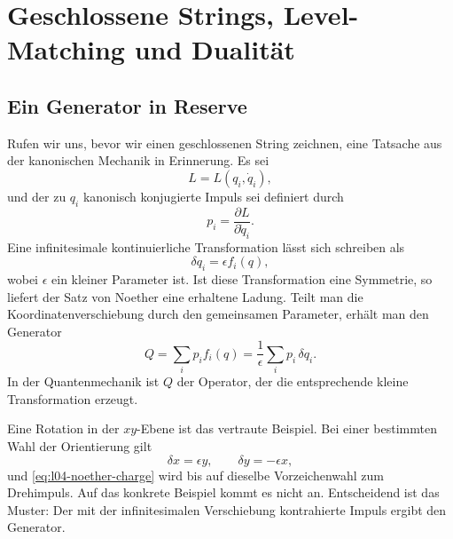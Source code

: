 \chapter{Geschlossene Strings, Level-Matching und Dualität}


\section{Ein Generator in Reserve}

Rufen wir uns, bevor wir einen geschlossenen String zeichnen, eine Tatsache aus der kanonischen Mechanik in Erinnerung. Es sei
\begin{equation}
  L=L(q_i,\dot q_i),
\end{equation}
und der zu \(q_i\) kanonisch konjugierte Impuls sei definiert durch
\begin{equation}
  p_i=\frac{\partial L}{\partial\dot q_i}.
\end{equation}
Eine infinitesimale kontinuierliche Transformation lässt sich schreiben als
\begin{equation}
  \delta q_i=\epsilon f_i(q),
  \label{eq:l04-infinitesimal-transformation}
\end{equation}
wobei \(\epsilon\) ein kleiner Parameter ist. Ist diese Transformation eine Symmetrie, so liefert der Satz von Noether eine erhaltene Ladung. Teilt man die Koordinatenverschiebung durch den gemeinsamen Parameter, erhält man den Generator
\begin{equation}
  Q=\sum_i p_i f_i(q)
   =\frac{1}{\epsilon}\sum_i p_i\,\delta q_i.
  \label{eq:l04-noether-charge}
\end{equation}
In der Quantenmechanik ist \(Q\) der Operator, der die entsprechende kleine Transformation erzeugt.

Eine Rotation in der \(xy\)-Ebene ist das vertraute Beispiel. Bei einer bestimmten Wahl der Orientierung gilt
\begin{equation}
  \delta x=\epsilon y,
  \qquad
  \delta y=-\epsilon x,
\end{equation}
und \eqref{eq:l04-noether-charge} wird bis auf dieselbe Vorzeichenwahl zum Drehimpuls. Auf das konkrete Beispiel kommt es nicht an. Entscheidend ist das Muster: Der mit der infinitesimalen Verschiebung kontrahierte Impuls ergibt den Generator.

